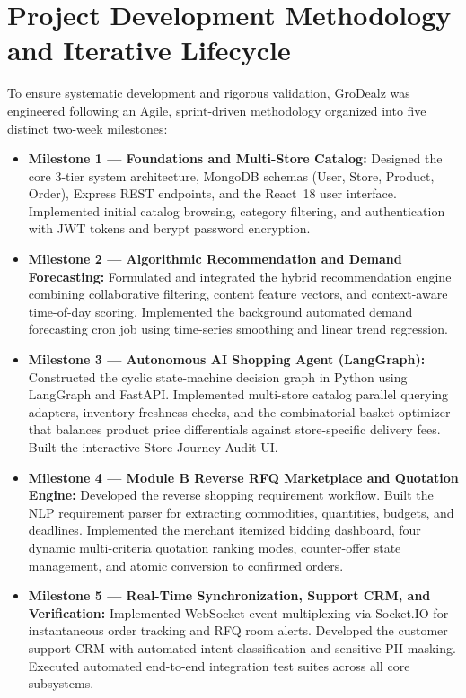 \section{Project Development Methodology and Iterative Lifecycle}

To ensure systematic development and rigorous validation, GroDealz was engineered following an Agile, sprint-driven methodology organized into five distinct two-week milestones:

\begin{itemize}
    \item \textbf{Milestone 1 --- Foundations and Multi-Store Catalog:} Designed the core 3-tier system architecture, MongoDB schemas (User, Store, Product, Order), Express REST endpoints, and the React~18 user interface. Implemented initial catalog browsing, category filtering, and authentication with JWT tokens and bcrypt password encryption.
    \item \textbf{Milestone 2 --- Algorithmic Recommendation and Demand Forecasting:} Formulated and integrated the hybrid recommendation engine combining collaborative filtering, content feature vectors, and context-aware time-of-day scoring. Implemented the background automated demand forecasting cron job using time-series smoothing and linear trend regression.
    \item \textbf{Milestone 3 --- Autonomous AI Shopping Agent (LangGraph):} Constructed the cyclic state-machine decision graph in Python using LangGraph and FastAPI. Implemented multi-store catalog parallel querying adapters, inventory freshness checks, and the combinatorial basket optimizer that balances product price differentials against store-specific delivery fees. Built the interactive Store Journey Audit UI.
    \item \textbf{Milestone 4 --- Module B Reverse RFQ Marketplace and Quotation Engine:} Developed the reverse shopping requirement workflow. Built the NLP requirement parser for extracting commodities, quantities, budgets, and deadlines. Implemented the merchant itemized bidding dashboard, four dynamic multi-criteria quotation ranking modes, counter-offer state management, and atomic conversion to confirmed orders.
    \item \textbf{Milestone 5 --- Real-Time Synchronization, Support CRM, and Verification:} Implemented WebSocket event multiplexing via Socket.IO for instantaneous order tracking and RFQ room alerts. Developed the customer support CRM with automated intent classification and sensitive PII masking. Executed automated end-to-end integration test suites across all core subsystems.
\end{itemize}


